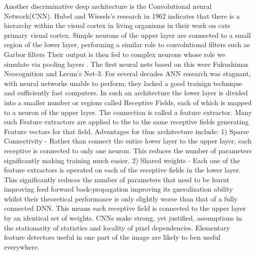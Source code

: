 Another discriminative deep architecture is the Convolutional neural Network(CNN)\citep{dengthree}. 
Hubel and Wiesels's research in 1962\citep{bengio2009advances} \citep{goyal2014object} indicates that there is a hierarchy within the visual cortex in living organisms in their work on cats primary visual cortex\citep{lecun1995convolutional}.
Simple neurons of the upper layer are connected to a small region of the lower layer, performing a similar role to convolutional filters such as Garbor filters\citep{gabor1946theory}
Their output is then fed to complex neurons whose role we simulate via pooling layers\citep{bengio2009advances}\citep{chen2014big}\citep{ciresan2012multi} .
The first neural nets based on this were Fukushimas Neocognition and Lecun's Net-3\citep{bengio2009advances}.
For several decades ANN research was stagnant, with neural networks unable to perform; they lacked a good trainign technique and sufficiently fast computers\citep{bengio2009advances}.
In such an architecture the lower layer is divided into a smaller number or regions called Receptive Fields, each of which is mapped to a neuron of the upper layer.\citep{bengio2009advances}
The connection is called a feature extractor.
Many such Feature extractors are applied to the to the same receptive fields generating Feature vectors for that field.
Advantages for thus architecture include:
1) Sparse Connectivity - Rather than connect the entire lower layer to the upper layer, each receptive is connected to only one neuron. This reduces the number of parameters significantly making training much easier\citep{bengio2009advances}.
2) Shared weights - Each one of the feature extractors is operated on each of the receptive fields in the lower layer\citep{lecun1995convolutional}.
This significantly reduces the number of parameters that need to be learnt improving feed forward back-propagation\citep{mo2012survey}\citep{bengio2009advances}  improving its gneralization ability whilst their theoretical performance is only slightly worse than that of a fully connected DNN\citep{krizhevsky2012imagenet}\citep{lecun1995convolutional}.
This means each receptive field is connected to the upper layer by an identical set of weights\citep{krizhevsky2012imagenet}.
CNNs make strong, yet justified, assumptions in the stationarity of statistics and locality of pixel dependencies.
Elementary feature detectors useful in one part of the image are likely to ben useful everywhere\citep{lecun1995convolutional}.


